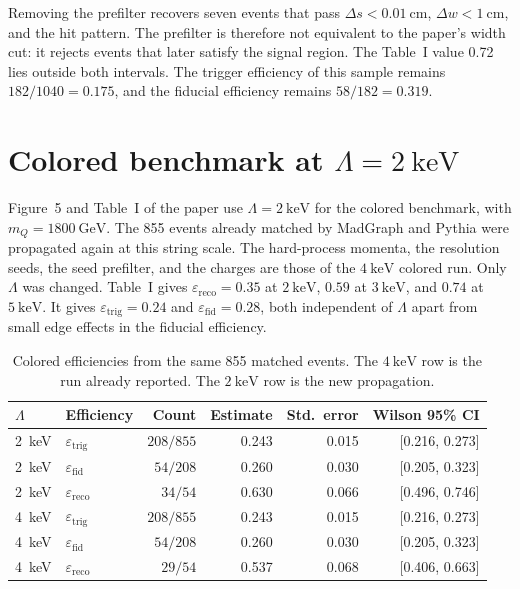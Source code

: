 \documentclass[11pt,a4paper]{article}
\begin{document}
Removing the prefilter recovers seven events that pass \(\Delta s < \SI{0.01}{\cm}\), \(\Delta w < \SI{1}{\cm}\), and the hit pattern.
The prefilter is therefore not equivalent to the paper's width cut: it rejects events that later satisfy the signal region.
The Table~I value 0.72 lies outside both intervals.
The trigger efficiency of this sample remains \(182/1040 = 0.175\), and the fiducial efficiency remains \(58/182 = 0.319\).

\section{Colored benchmark at \(\Lambda = \SI{2}{\keV}\)}
Figure~5 and Table~I of the paper use \(\Lambda = \SI{2}{\keV}\) for the colored benchmark, with \(m_Q = \SI{1800}{\GeV}\).
The 855 events already matched by MadGraph and Pythia were propagated again at this string scale.
The hard-process momenta, the resolution seeds, the seed prefilter, and the charges are those of the \(\SI{4}{\keV}\) colored run.
Only \(\Lambda\) was changed.
Table~I gives \(\varepsilon_{\mathrm{reco}} = 0.35\) at \(\SI{2}{\keV}\), \(0.59\) at \(\SI{3}{\keV}\), and \(0.74\) at \(\SI{5}{\keV}\).
It gives \(\varepsilon_{\mathrm{trig}} = 0.24\) and \(\varepsilon_{\mathrm{fid}} = 0.28\), both independent of \(\Lambda\) apart from small edge effects in the fiducial efficiency.

\begin{table}[H]
\centering
\caption{Colored efficiencies from the same 855 matched events. The \(\SI{4}{\keV}\) row is the run already reported. The \(\SI{2}{\keV}\) row is the new propagation.}
\label{tab:qcd2}
\small
\begin{tabular}{llrrrr}
\toprule
\(\Lambda\) & Efficiency & Count & Estimate & Std.\ error & Wilson 95\% CI \\
\midrule
\SI{2}{\keV} & \(\varepsilon_{\mathrm{trig}}\) & \(208/855\) & 0.243 & 0.015 & [0.216, 0.273] \\
\SI{2}{\keV} & \(\varepsilon_{\mathrm{fid}}\)  & \(54/208\)  & 0.260 & 0.030 & [0.205, 0.323] \\
\SI{2}{\keV} & \(\varepsilon_{\mathrm{reco}}\) & \(34/54\)   & 0.630 & 0.066 & [0.496, 0.746] \\
\midrule
\SI{4}{\keV} & \(\varepsilon_{\mathrm{trig}}\) & \(208/855\) & 0.243 & 0.015 & [0.216, 0.273] \\
\SI{4}{\keV} & \(\varepsilon_{\mathrm{fid}}\)  & \(54/208\)  & 0.260 & 0.030 & [0.205, 0.323] \\
\SI{4}{\keV} & \(\varepsilon_{\mathrm{reco}}\) & \(29/54\)   & 0.537 & 0.068 & [0.406, 0.663] \\
\bottomrule
\end{tabular}
\end{table}
\end{document}
